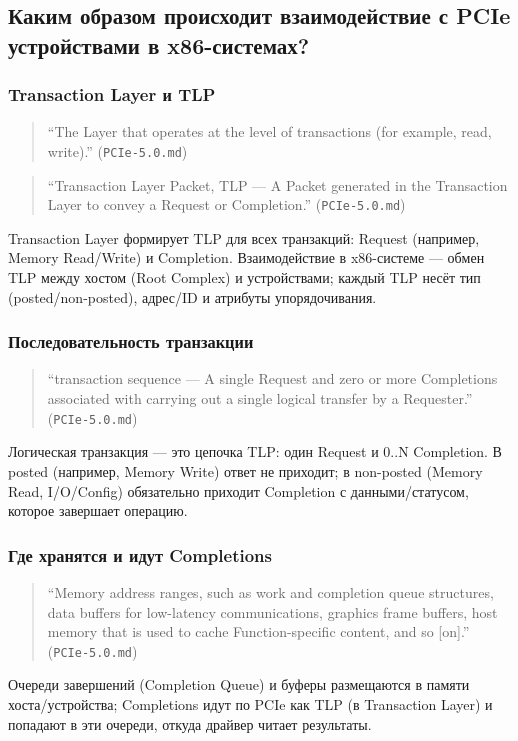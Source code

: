 \documentclass[a4paper,12pt]{article}
\begin{document}
\subsection{Каким образом происходит взаимодействие с PCIe
устройствами в x86-системах?}
\subsubsection{Transaction Layer и TLP}
\begin{quote}
``The Layer that operates at the level of transactions (for example, read, write).'' (\texttt{PCIe-5.0.md})
\end{quote}
\begin{quote}
``Transaction Layer Packet, TLP — A Packet generated in the Transaction Layer to convey a Request or Completion.'' (\texttt{PCIe-5.0.md})
\end{quote}
Transaction Layer формирует TLP для всех транзакций: Request (например, Memory Read/Write) и Completion. Взаимодействие в x86-системе — обмен TLP между хостом (Root Complex) и устройствами; каждый TLP несёт тип (posted/non-posted), адрес/ID и атрибуты упорядочивания.
\subsubsection{Последовательность транзакции}
\begin{quote}
``transaction sequence — A single Request and zero or more Completions associated with carrying out a single logical transfer by a Requester.'' (\texttt{PCIe-5.0.md})
\end{quote}
Логическая транзакция — это цепочка TLP: один Request и 0..N Completion. В posted (например, Memory Write) ответ не приходит; в non-posted (Memory Read, I/O/Config) обязательно приходит Completion с данными/статусом, которое завершает операцию.
\subsubsection{Где хранятся и идут Completions}
\begin{quote}
``Memory address ranges, such as work and completion queue structures, data buffers for low-latency communications, graphics frame buffers, host memory that is used to cache Function-specific content, and so [on].'' (\texttt{PCIe-5.0.md})
\end{quote}
Очереди завершений (Completion Queue) и буферы размещаются в памяти хоста/устройства; Completions идут по PCIe как TLP (в Transaction Layer) и попадают в эти очереди, откуда драйвер читает результаты.
\end{document}

